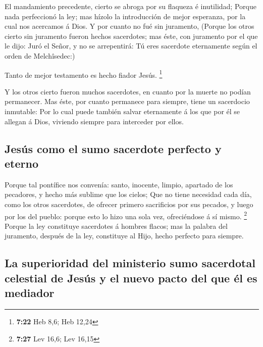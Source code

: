  El mandamiento precedente, cierto se abroga por su
flaqueza é inutilidad;  Porque nada perfeccionó la ley;
mas hízolo la introducción de mejor esperanza, por la cual nos acercamos
á Dios.  Y por cuanto no fué sin juramento,
 (Porque los otros cierto sin juramento fueron hechos
sacerdotes; mas éste, con juramento por el que le dijo: Juró el Señor, y
no se arrepentirá: Tú eres sacerdote eternamente según el orden de
Melchîsedec:)

 Tanto de mejor testamento es hecho fiador Jesús.
\footnote{\textbf{7:22} Heb 8,6; Heb 12,24}

 Y los otros cierto fueron muchos sacerdotes, en cuanto
por la muerte no podían permanecer.  Mas éste, por cuanto
permanece para siempre, tiene un sacerdocio inmutable: 
Por lo cual puede también salvar eternamente á los que por él se allegan
á Dios, viviendo siempre para interceder por ellos.

\hypertarget{jesuxfas-como-el-sumo-sacerdote-perfecto-y-eterno}{%
\subsection{Jesús como el sumo sacerdote perfecto y
eterno}\label{jesuxfas-como-el-sumo-sacerdote-perfecto-y-eterno}}

 Porque tal pontífice nos convenía: santo, inocente,
limpio, apartado de los pecadores, y hecho más sublime que los cielos;
 Que no tiene necesidad cada día, como los otros
sacerdotes, de ofrecer primero sacrificios por sus pecados, y luego por
los del pueblo: porque esto lo hizo una sola vez, ofreciéndose á sí
mismo. \footnote{\textbf{7:27} Lev 16,6; Lev 16,15} 
Porque la ley constituye sacerdotes á hombres flacos; mas la palabra del
juramento, después de la ley, constituye al Hijo, hecho perfecto para
siempre.

\hypertarget{la-superioridad-del-ministerio-sumo-sacerdotal-celestial-de-jesuxfas-y-el-nuevo-pacto-del-que-uxe9l-es-mediador}{%
\subsection{La superioridad del ministerio sumo sacerdotal celestial de
Jesús y el nuevo pacto del que él es
mediador}\label{la-superioridad-del-ministerio-sumo-sacerdotal-celestial-de-jesuxfas-y-el-nuevo-pacto-del-que-uxe9l-es-mediador}}

